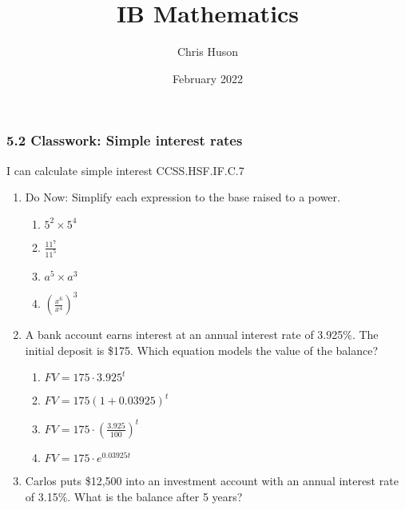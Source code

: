 \documentclass[12pt, twoside]{article}
\title{IB Mathematics}
\author{Chris Huson}
\date{February 2022}
\begin{document}
\subsubsection*{5.2 Classwork: Simple interest rates}
I can calculate simple interest \hfill CCSS.HSF.IF.C.7

\begin{enumerate}
\item Do Now: Simplify each expression to the base raised to a power.
    \begin{multicols}{2}
    \begin{enumerate}[itemsep=0.5cm]
        \item $5^2 \times 5^4$
        \item $\displaystyle \frac{11^7}{11^5}$
        \item $a^5 \times a^3$
        \item $\displaystyle \left( \frac{x^6}{x^4}\right)^{3}$
    \end{enumerate}
    \end{multicols}

\item A bank account earns interest at an annual interest rate of 3.925\%. The initial deposit is \$175. Which equation models the value of the balance?
\begin{multicols}{2}
    \begin{enumerate}[itemsep=0.5cm]
        \item $FV=175 \cdot 3.925^{t}$
        \item $FV=175 (1+0.03925)^{t}$
        \item $\displaystyle FV=175 \cdot \left( \frac{3.925}{100}\right)^{t}$
        \item $FV=175 \cdot e^{0.03925t}$
    \end{enumerate}
\end{multicols}

\item Carlos puts \$12,500 into an investment account with an annual interest rate of 3.15\%. What is the balance after 5 years? \vspace{2cm}


\end{enumerate}
\end{document}
